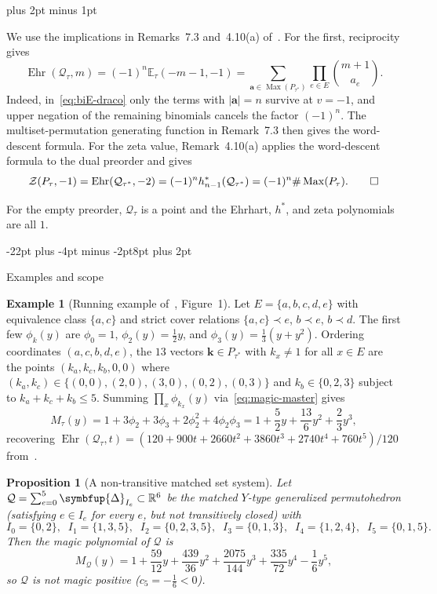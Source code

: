 \documentclass[11pt,letterpaper]{article}
\makeatletter
\renewcommand{\section}{\@startsection{section}{1}{\z@}%
  {-22pt plus -4pt minus -2pt}{8pt plus 2pt}%
  {\normalfont\fontsize{14}{17}\selectfont\bfseries\raggedright}}
\renewenvironment{proof}[1][\proofname]{%
  \par\pushQED{\qed}\normalfont
  \topsep9pt plus 2pt minus 1pt\relax
  \trivlist\item[\hskip\labelsep\itshape #1\@addpunct{.}]\ignorespaces
}{\popQED\endtrivlist\@endpefalse}
\theoremstyle{result}
\newtheorem{proposition}[theorem]{Proposition}
\theoremstyle{definition}
\newtheorem{example}[theorem]{Example}
\theoremstyle{remark}
\newcommand{\RR}{\mathbb{R}}
\newcommand{\biE}{\mathbb{E}}
\newcommand{\qQ}{\mathcal{Q}}
\newcommand{\zZ}{\mathcal{Z}}
\newcommand{\bDelta}{\symbfup{\Delta}}
\newcommand{\Ehr}{\operatorname{Ehr}}
\newcommand{\Max}{\operatorname{Max}}
\makeatother
\begin{document}
\begin{proof}[Proof of Corollary~\ref{cor:hstar-zeta}]
We use the implications in Remarks~7.3 and~4.10(a) of~\cite{AC26}. For the first, reciprocity gives
\[
\Ehr(\qQ_\tau,m)=(-1)^n\biE_\tau(-m-1,-1)
=\sum_{\mathbf{a}\in\Max(P_{\tau^*})}\prod_{e\in E}\binom{m+1}{a_e}.
\]
Indeed, in~\eqref{eq:biE-draco} only the terms with $|\mathbf{a}|=n$ survive at $v=-1$, and upper negation of the remaining binomials cancels the factor $(-1)^n$. The multiset-permutation generating function in Remark~7.3 then gives the word-descent formula. For the zeta value, Remark~4.10(a) applies the word-descent formula to the dual preorder and gives
\[
\zZ(P_\tau,-1)=\Ehr(\qQ_{\tau^*},-2)
  =(-1)^n h^*_{n-1}(\qQ_{\tau^*})
  =(-1)^n\#\Max(P_\tau). \qedhere
\]
\end{proof}

For the empty preorder, $\qQ_\tau$ is a point and the Ehrhart, $h^*$, and zeta polynomials are all $1$.

\section{Examples and scope}
\label{sec:examples}

\begin{samepage}
\begin{example}[Running example of~\cite{AC26}, Figure~1]\label{ex:fig1}
Let $E=\{a,b,c,d,e\}$ with equivalence class $\{a,c\}$ and strict cover relations $\{a,c\}\prec e$, $b\prec e$, $b\prec d$. The first few $\phi_k(y)$ are $\phi_0=1$, $\phi_2(y)=\frac{1}{2}y$, and $\phi_3(y)=\frac{1}{3}(y+y^2)$. Ordering coordinates $(a,c,b,d,e)$, the $13$ vectors $\mathbf{k}\in P_{\tau^*}$ with $k_x\ne 1$ for all $x\in E$ are the points $(k_a,k_c,k_b,0,0)$ where $(k_a,k_c)\in\{(0,0),(2,0),(3,0),(0,2),(0,3)\}$ and $k_b\in\{0,2,3\}$ subject to $k_a+k_c+k_b\le 5$. Summing $\prod_x\phi_{k_x}(y)$ via~\eqref{eq:magic-master} gives
\[
M_\tau(y) = 1 + 3\phi_2 + 3\phi_3 + 2\phi_2^2 + 4\phi_2\phi_3
= 1 + \frac{5}{2}y + \frac{13}{6}y^2 + \frac{2}{3}y^3,
\]
recovering $\Ehr(\qQ_\tau,t)=(120+900t+2660t^2+3860t^3+2740t^4+760t^5)/120$ from~\cite[Section~7]{AC26}.
\end{example}
\end{samepage}

\begin{samepage}
\begin{proposition}[A non-transitive matched set system]\label{prop:sharp}
Let $\qQ=\sum_{e=0}^5 \bDelta_{I_e}\subset\RR^6$ be the matched $Y$-type generalized permutohedron (satisfying $e\in I_e$ for every $e$, but not transitively closed) with
\[
I_0=\{0,2\},\;\; I_1=\{1,3,5\},\;\; I_2=\{0,2,3,5\},\;\; I_3=\{0,1,3\},\;\; I_4=\{1,2,4\},\;\; I_5=\{0,1,5\}.
\]
Then the magic polynomial of $\qQ$ is
\[
M_{\qQ}(y) = 1 + \frac{59}{12}y + \frac{439}{36}y^2 + \frac{2075}{144}y^3 + \frac{335}{72}y^4 - \frac{1}{6}y^5,
\]
so $\qQ$ is not magic positive ($c_5=-\frac{1}{6}<0$).
\end{proposition}
\end{samepage}
\end{document}
